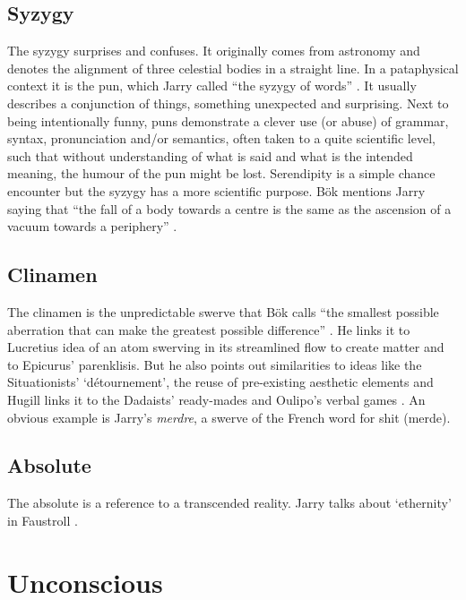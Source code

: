 

\subsection{Syzygy}
\label{s:syzygy}

The syzygy surprises and confuses. It originally comes from astronomy and denotes the alignment of three celestial bodies in a straight line. In a pataphysical context it is the pun, which Jarry called ``the syzygy of words'' \citeyear{Jarry1996}. It usually describes a conjunction of things, something unexpected and surprising. Next to being intentionally funny, puns demonstrate a clever use (or abuse) of grammar, syntax, pronunciation and/or semantics, often taken to a quite scientific level, such that without understanding of what is said and what is the intended meaning, the humour of the pun might be lost. Serendipity is a simple chance encounter but the syzygy has a more scientific purpose. Bök mentions Jarry saying that ``the fall of a body towards a centre is the same as the ascension of a vacuum towards a periphery'' \citeyear[p.42]{Bok2002}.


\subsection{Clinamen}
\label{s:clinamen}

The clinamen is the unpredictable swerve that Bök calls ``the smallest possible aberration that can make the greatest possible difference'' \citeyear[p.43]{Bok2002}. He links it to Lucretius idea of an atom swerving in its streamlined flow to create matter and to Epicurus' parenklisis. But he also points out similarities to ideas like the Situationists' `détournement', the reuse of pre-existing aesthetic elements and Hugill links it to the Dadaists' ready-mades and Oulipo's verbal games \citeyear{Hugill2012}. An obvious example is Jarry's \emph{merdre}, a swerve of the French word for shit (merde).


\subsection{Absolute}
\label{s:absolute}

The absolute is a reference to a transcended reality. Jarry talks about `ethernity' in Faustroll \citeyear[p.104]{Jarry1996}.


\section{Unconscious}


